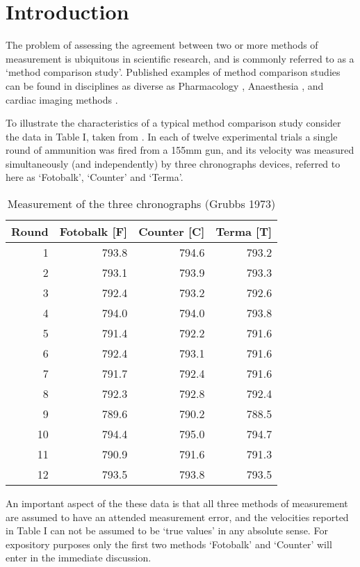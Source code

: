 \documentclass{report}
\begin{document}
\section{Introduction}
The problem of assessing the agreement between two or more methods
of measurement is ubiquitous in scientific research, and is
commonly referred to as a `method comparison study'. Published
examples of method comparison studies can be found in disciplines
as diverse as Pharmacology \citep{ludbrook97}, Anaesthesia
\citep{Myles}, and cardiac imaging methods \citep{Krumm}.
\smallskip

To illustrate the characteristics of a typical method comparison
study consider the data in Table I, taken from \citet{Grubbs73}.
In each of twelve experimental trials a single round of ammunition
was fired from a 155mm gun, and its velocity was measured
simultaneously (and independently) by three chronographs devices,
referred to here as `Fotobalk', `Counter' and `Terma'.
\smallskip


\newpage

\begin{table}[ht]
	\begin{center}
		\begin{tabular}{rrrr}
			\hline
			Round& Fotobalk [F] & Counter [C]& Terma [T]\\
			\hline
			1 & 793.8 & 794.6 & 793.2 \\
			2 & 793.1 & 793.9 & 793.3 \\
			3 & 792.4 & 793.2 & 792.6 \\
			4 & 794.0 & 794.0 & 793.8 \\
			5 & 791.4 & 792.2 & 791.6 \\
			6 & 792.4 & 793.1 & 791.6 \\
			7 & 791.7 & 792.4 & 791.6 \\
			8 & 792.3 & 792.8 & 792.4 \\
			9 & 789.6 & 790.2 & 788.5 \\
			10 & 794.4 & 795.0 & 794.7 \\
			11 & 790.9 & 791.6 & 791.3 \\
			12 & 793.5 & 793.8 & 793.5 \\
			\hline
		\end{tabular}
		\caption{Measurement of the three chronographs (Grubbs 1973)}
	\end{center}
\end{table}

An important aspect of the these data is that all three methods of
measurement are assumed to have an attended measurement error, and
the velocities reported in Table I can not be assumed to be `true
values' in any absolute sense. For expository purposes only the
first two methods `Fotobalk' and `Counter' will enter in the
immediate discussion.
\end{document}
